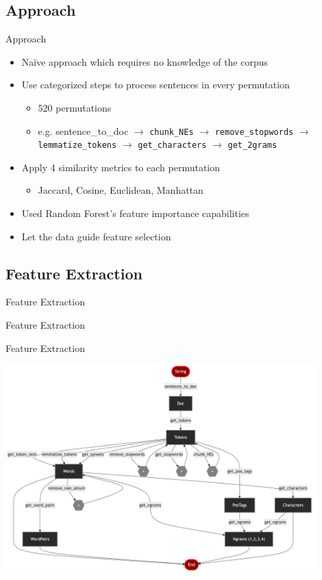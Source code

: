 \documentclass{beamer}
\begin{document}
\subsection{Approach}
\begin{frame}{Approach}
    \begin{itemize}
        \item Naïve approach which requires no knowledge of the corpus
        \item Use categorized steps to process sentences in every permutation
        \begin{itemize}
            \item 520 permutations
            \item e.g. sentence\_to\_doc $\rightarrow$ \texttt{chunk\_NEs} $\rightarrow$ \texttt{remove\_stopwords} $\rightarrow$ \texttt{lemmatize\_tokens} $\rightarrow$ \texttt{get\_characters} $\rightarrow$ \texttt{get\_2grams}
        \end{itemize}
        \item Apply 4 similarity metrics to each permutation
        \begin{itemize}
            \item Jaccard, Cosine, Euclidean, Manhattan
        \end{itemize}
        \item Used Random Forest's feature importance capabilities
        \item Let the data guide feature selection
    \end{itemize}

\end{frame}

\subsection{Feature Extraction}
\begin{frame}{Feature Extraction}
    \begin{center}
        \Large Feature Extraction
    \end{center}
\end{frame}

\begin{frame}{Feature Extraction}
    \begin{center}
        \includegraphics[width=0.9\textwidth]{figures/mermaid/permutations.md-1.png}
    \end{center}
\end{frame}
\end{document}
